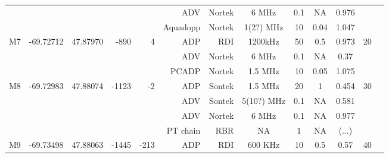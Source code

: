 \documentclass[letterpaper,10pt,landscape]{article}
\begin{document}
\begin{table}
\begin{tabular}{|r|c|c|r|r|r|r|c|c|c|c|c|c|}
    ~                   &                            &                           &                        &                       & ADV          & Nortek     & 6 MHz     & 0.1       & NA       & 0.976      &                     \\ %
    ~                   &                            &                           &                        &                       & Aquadopp     & Nortek     & 1(2?) MHz & 10        & 0.04     & 1.047      &                     \\\hline
    \multirow{3}{*}{M7} & \multirow{3}{*}{-69.72712} & \multirow{3}{*}{47.87970} & \multirow{3}{*}{-890}  & \multirow{3}{*}{4}    & ADP          & RDI        & 1200kHz   & 50        & 0.5      & 0.973      & \multirow{3}{*}{20} \\ 
    ~                   &                            &                           &                        &                       & ADV          & Nortek     & 6 MHz     & 0.1       & NA       & 0.37       &                     \\ %
    ~                   &                            &                           &                        &                       & PCADP        & Nortek     & 1.5 MHz   & 10        & 0.05     & 1.075      &                     \\\hline
    \multirow{4}{*}{M8} & \multirow{4}{*}{-69.72983} & \multirow{4}{*}{47.88074} & \multirow{4}{*}{-1123} & \multirow{4}{*}{-2}   & ADP          & Sontek     & 1.5 MHz   & 20        & 1        & 0.454      & \multirow{4}{*}{30} \\ 
    ~                   &                            &                           &                        &                       & ADV          & Sontek     & 5(10?) MHz& 0.1       & NA       & 0.581      &                     \\ 
    ~                   &                            &                           &                        &                       & ADV          & Nortek     & 6 MHz     & 0.1       & NA       & 0.977      &                     \\ %
    ~                   &                            &                           &                        &                       & PT chain     & RBR        & NA        & 1         & NA       & (...)      &                     \\\hline
    M9                  & -69.73498                  & 47.88063                  & -1445                  & -213                  & ADP          & RDI        & 600 KHz   & 10        & 0.5      & 0.57       & 40                  \\\hline

\end{tabular}
\end{table}
\end{document}
